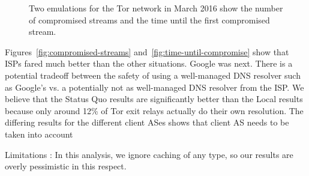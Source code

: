 \begin{figure}[t]
\centering
{}
\caption{Two emulations for the Tor network in March 2016 show the
  number of compromised streams and the time until the first compromised
  stream.} 
\label{fig:compromise-stream-time}
\end{figure}

Figures~\ref{fig:compromised-streams}
and~\ref{fig:time-until-compromise} show that
ISPs fared much better than the other situations. Google was next. There is a potential 
tradeoff between the safety of using a well-managed DNS resolver such as Google's vs. 
a potentially not as well-managed DNS resolver from the ISP.
We believe that the Status Quo results are significantly better than the 
Local results because only around 12\% 
of Tor exit relays actually do their own resolution.
The differing results for the different client ASes shows that client AS needs to be 
taken into account 

Limitations :
In this analysis, we ignore caching of any type, so our results are overly 
pessimistic in this respect. 
